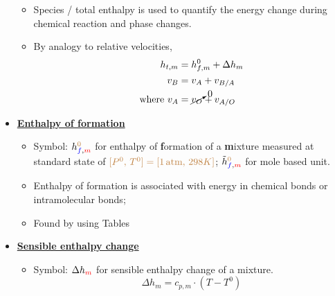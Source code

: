 \begin{itemize}
\begin{itemize}
        \item Species / total enthalpy is used to quantify the energy change during chemical reaction and phase changes.
        \item By analogy to relative velocities,
        \begin{align*}
            h_{t,m} &= h_{f,m}^{0} + \Delta h_m \\
            v_B &= v_A + v_{B/A} \\
            \text{where } v_A &= \cancelto{0}{v_O} + v_{A/O}
        \end{align*}
    \end{itemize}
    \item {\color{blue}\textbf{\ul{Enthalpy of formation}}} 
    \begin{itemize}
        \item Symbol: $h_{{\color{blue}f},{\color{red}m}}^{{\color{brown}0}}$ for enthalpy of {\color{blue}\textbf{f}}ormation of a {\color{red}\textbf{m}}ixture measured at standard state of ${\color{brown}[P^{0},\, T^{0}] = [1\, \text{atm},\, 298 K]}$; $\tilde{h}_{{\color{blue}f},{\color{red}m}}^{{\color{brown}0}}$ for mole based unit.
        \item Enthalpy of formation is associated with energy in {\color{red}chemical bonds} or {\color{red}intramolecular bonds};
        \item Found by using Tables
    \end{itemize}
    \item {\color{blue}\textbf{\ul{Sensible enthalpy change}}}
    \begin{itemize}
        \item Symbol: $\Delta h_{{\color{red}m}}$ for sensible enthalpy change of a {\color{red}m}ixture.
        \begin{equation*}
            \Delta h_{m} = c_{p,m} \cdot (T - T^0)
        \end{equation*}
    \end{itemize}
    

\end{itemize}
